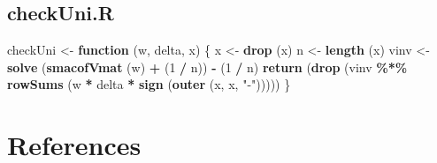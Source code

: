 \documentclass[
  12pt,
]{article}
\newenvironment{Shaded}{\begin{snugshade}}{\end{snugshade}}
\newcommand{\ControlFlowTok}[1]{\textcolor[rgb]{0.13,0.29,0.53}{\textbf{#1}}}
\newcommand{\DecValTok}[1]{\textcolor[rgb]{0.00,0.00,0.81}{#1}}
\newcommand{\FunctionTok}[1]{\textcolor[rgb]{0.13,0.29,0.53}{\textbf{#1}}}
\newcommand{\NormalTok}[1]{#1}
\newcommand{\OtherTok}[1]{\textcolor[rgb]{0.56,0.35,0.01}{#1}}
\newcommand{\SpecialCharTok}[1]{\textcolor[rgb]{0.81,0.36,0.00}{\textbf{#1}}}
\newcommand{\StringTok}[1]{\textcolor[rgb]{0.31,0.60,0.02}{#1}}
\begin{document}
\subsection{checkUni.R}\label{checkuni.r}

\begin{Shaded}
\begin{Highlighting}[]
\NormalTok{checkUni }\OtherTok{\textless{}{-}} \ControlFlowTok{function}\NormalTok{ (w, delta, x) \{}
\NormalTok{  x }\OtherTok{\textless{}{-}} \FunctionTok{drop}\NormalTok{ (x)}
\NormalTok{  n }\OtherTok{\textless{}{-}} \FunctionTok{length}\NormalTok{ (x)}
\NormalTok{  vinv }\OtherTok{\textless{}{-}} \FunctionTok{solve}\NormalTok{ (}\FunctionTok{smacofVmat}\NormalTok{ (w) }\SpecialCharTok{+}\NormalTok{ (}\DecValTok{1} \SpecialCharTok{/}\NormalTok{ n)) }\SpecialCharTok{{-}}\NormalTok{ (}\DecValTok{1} \SpecialCharTok{/}\NormalTok{ n)}
  \FunctionTok{return}\NormalTok{ (}\FunctionTok{drop}\NormalTok{ (vinv }\SpecialCharTok{\%*\%} \FunctionTok{rowSums}\NormalTok{ (w }\SpecialCharTok{*}\NormalTok{ delta }\SpecialCharTok{*} \FunctionTok{sign}\NormalTok{ (}\FunctionTok{outer}\NormalTok{ (x, x, }\StringTok{"{-}"}\NormalTok{)))))}
\NormalTok{\}}
\end{Highlighting}
\end{Shaded}

\section*{References}\label{references}
\end{document}
